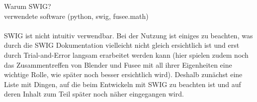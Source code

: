  \label{sec:Umsetzung}


Warum SWIG?\\
verwendete software (python, swig, fusee.math)\\\\

SWIG ist nicht intuitiv verwendbar. Bei der Nutzung ist einiges zu beachten, was durch die SWIG Dokumentation vielleicht nicht gleich ersichtlich ist und erst durch Trial-and-Error langsam erarbeitet werden kann (hier spielen zudem noch das Zusammentreffen von Blender und Fusee mit all ihrer Eigenheiten eine wichtige Rolle, wie später noch besser ersichtlich wird). Deshalb zunächst eine Liste mit Dingen, auf die beim Entwickeln mit SWIG zu beachten ist und auf deren Inhalt zum Teil später noch näher eingegangen wird.

